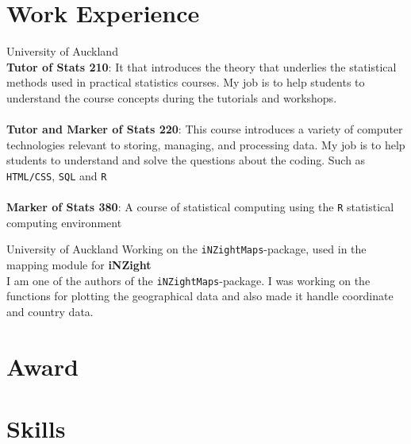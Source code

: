 \documentclass[11pt,a4paper, twoside]{moderncv} %
\begin{document}
\section{Work Experience}
  {University of Auckland}{}{}{
	~\\
	\textbf{Tutor of Stats 210}: It that introduces the theory that underlies the statistical methods used in practical statistics courses. My job is to help students to understand the course concepts during the tutorials and workshops. \\~\\
	\textbf{Tutor and Marker of Stats 220}: This course introduces a variety of computer technologies relevant to storing, managing, and processing data. My job is to help students to understand and solve the questions about the coding. Such as \texttt{HTML/CSS}, \texttt{SQL} and \texttt{R} \\~\\
	\textbf{Marker of Stats 380}: A course of statistical computing using the \texttt{R} statistical computing environment\\}

  {University of Auckland}{}{}{
	Working on the \texttt{iNZightMaps}-package, used in the mapping module for \textbf{iNZight}\\
	I am one of the authors of the \texttt{iNZightMaps}-package. I was working on the functions for plotting the geographical data and also made it handle coordinate and country data.
}




\section{Award}
  {}


\section{Skills}
\end{document}

